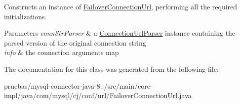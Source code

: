 Constructs an instance of \mbox{\hyperlink{classcom_1_1mysql_1_1cj_1_1conf_1_1url_1_1_failover_connection_url}{Failover\+Connection\+Url}}, performing all the required initializations.


\begin{DoxyParams}{Parameters}
{\em conn\+Str\+Parser} & a \mbox{\hyperlink{classcom_1_1mysql_1_1cj_1_1conf_1_1_connection_url_parser}{Connection\+Url\+Parser}} instance containing the parsed version of the original connection string \\
\hline
{\em info} & the connection arguments map \\
\hline
\end{DoxyParams}


The documentation for this class was generated from the following file\+:\begin{DoxyCompactItemize}
\item 
pruebas/mysql-\/connector-\/java-\/8../src/main/core-\/impl/java/com/mysql/cj/conf/url/Failover\+Connection\+Url.\+java\end{DoxyCompactItemize}

